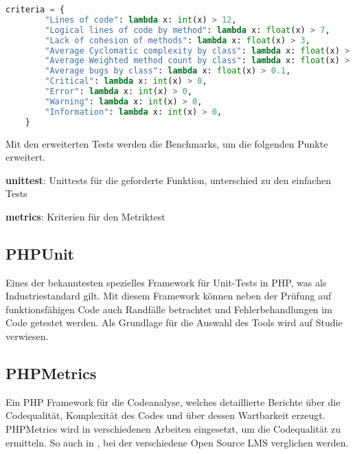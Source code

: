 \begin{lstlisting}[language=python,caption={Beispiel für Bewertungskriterien},label=lst:phpmetric_criteria_example]
	criteria = {
		"Lines of code": lambda x: int(x) > 12,
		"Logical lines of code by method": lambda x: float(x) > 7,
		"Lack of cohesion of methods": lambda x: float(x) > 3,
		"Average Cyclomatic complexity by class": lambda x: float(x) > 10,
		"Average Weighted method count by class": lambda x: float(x) > 20,
		"Average bugs by class": lambda x: float(x) > 0.1,
		"Critical": lambda x: int(x) > 0,
		"Error": lambda x: int(x) > 0,
		"Warning": lambda x: int(x) > 0,
		"Information": lambda x: int(x) > 0,
	}
\end{lstlisting}

Mit den erweiterten Tests werden die Benchmarks, um die folgenden Punkte erweitert.

\begin{myitemize}
	\item \textbf{unittest}: Unittests für die geforderte Funktion, unterschied zu den einfachen Tests
	\item \textbf{metrics}: Kriterien für den Metriktest
\end{myitemize}

\subsection{PHPUnit}
Eines der bekanntesten spezielles Framework für Unit-Tests in PHP, was als Industriestandard gilt. Mit diesem Framework können neben der Prüfung auf funktionsfähigen Code auch Randfälle betrachtet und Fehlerbehandlungen im Code getestet werden. Als Grundlage für die Auswahl des Tools wird auf Studie \cite{mohamad-2016} verwiesen.

\subsection{PHPMetrics}
Ein PHP Framework für die Codeanalyse, welches detaillierte Berichte über die Codequalität, Komplexität des Codes und über dessen Wartbarkeit erzeugt. PHPMetrics wird in verschiedenen Arbeiten eingesetzt, um die Codequalität zu ermitteln. So auch in \cite{anggrain-2016}, bei der verschiedene Open Source LMS verglichen werden.


